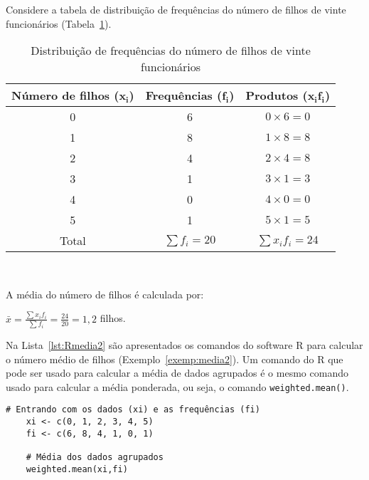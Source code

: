 \documentclass[11pt,fleqn]{book} %
\begin{document}
\begin{example} \label{exemp:media2}

Considere a tabela de distribuição de frequências do número de filhos de vinte funcionários (Tabela~\ref{tab:distnumfilhos}).

	\begin{table}[h]
	\caption{Distribuição de frequências do número de filhos de vinte funcionários}
	\label{tab:distnumfilhos} 
	\vspace{-0.1cm}
	\centering
	\begin{tabular}{c c c}
	\toprule
	\textbf{Número de filhos} ($\bm{x_i}$) & \textbf{Frequências} ($\bm{f_i}$) & \textbf{Produtos} ($\bm{x_i f_i}$) \\
	\midrule
	0 & 6 & $0 \times 6 = 0$ \\
	1 & 8 & $1 \times 8 = 8$ \\
	2 & 4 & $2 \times 4 = 8$ \\
	3 & 1 & $3 \times 1 = 3$ \\
	4 & 0 & $4 \times 0 = 0$ \\
	5 & 1 & $5 \times 1 = 5$ \\
	\hline
	Total & $\sum{f_i}=20$ & $\sum{x_i f_i}=24$\\
	\bottomrule
	\end{tabular} \\
	\end{table}
	
A média do número de filhos é calculada por:

\begin{center}
$\displaystyle \bar{x}=\frac{\sum{x_i f_i}}{\sum{f_i}}=\frac{24}{20}=1,2$ filhos.
\end{center}

\end{example}


Na Lista~\ref{lst:Rmedia2} são apresentados os comandos do software R para calcular o número médio de filhos (Exemplo~\ref{exemp:media2}). Um comando do R que pode ser usado para calcular a média de dados agrupados é o mesmo comando usado para calcular a média ponderada, ou seja, o comando \texttt{weighted.mean()}. \\

\begin{scriptsize}
	\estiloR
	\begin{lstlisting}[caption={Comandos do software R}, label=lst:Rmedia2]
	# Entrando com os dados (xi) e as frequências (fi)
	xi <- c(0, 1, 2, 3, 4, 5)
	fi <- c(6, 8, 4, 1, 0, 1)

	# Média dos dados agrupados
	weighted.mean(xi,fi)

	\end{lstlisting}
\end{scriptsize}
\end{document}
